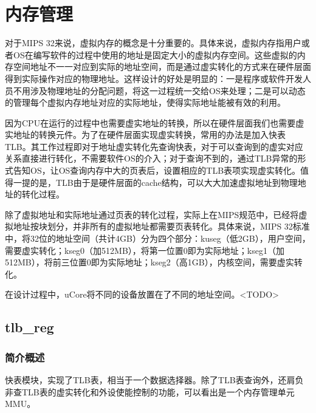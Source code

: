 \chapter{内存管理}

对于MIPS 32来说，虚拟内存的概念是十分重要的。具体来说，虚拟内存指用户或者OS在编写软件的过程中使用的地址是固定大小的虚拟内存空间。这些虚拟的内存空间地址不一一对应到实际的地址空间，而是通过虚实转化的方式来在硬件层面得到实际操作对应的物理地址。这样设计的好处是明显的：一是程序或软件开发人员不用涉及物理地址的分配问题，将这一过程统一交给OS来处理；二是可以动态的管理每个虚拟内存地址对应的实际地址，使得实际地址能被有效的利用。

因为CPU在运行的过程中也需要虚实地址的转换，所以在硬件层面我们也需要虚实地址的转换元件。为了在硬件层面实现虚实转换，常用的办法是加入快表TLB。其工作过程即对于地址虚实转化先查询快表，对于可以查询到的虚实对应关系直接进行转化，不需要软件OS的介入；对于查询不到的，通过TLB异常的形式告知OS，让OS查询内存中大的页表后，设置相应的TLB表项实现虚实转化。值得一提的是，TLB由于是硬件层面的cache结构，可以大大加速虚拟地址到物理地址的转化过程。

除了虚拟地址和实际地址通过页表的转化过程，实际上在MIPS规范中，已经将虚拟地址按块划分，并非所有的虚拟地址都需要页表转化。具体来说，MIPS 32标准中，将32位的地址空间（共计4GB）分为四个部分：kuseg（低2GB），用户空间，需要虚实转化；kseg0（加512MB），将第一位置0即为实际地址；kseg1（加512MB），将前三位置0即为实际地址；kseg2（高1GB），内核空间，需要虚实转化。

在设计过程中，uCore将不同的设备放置在了不同的地址空间。<TODO>

\section{tlb\_reg}

    \subsection{简介概述}
    快表模块，实现了TLB表，相当于一个数据选择器。除了TLB表查询外，还肩负非查TLB表的虚实转化和外设使能控制的功能，可以看出是一个内存管理单元MMU。
    
